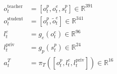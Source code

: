 \documentclass[border=7pt]{standalone}
\begin{document}
\color{ink}
$\displaystyle \begin{aligned}o_t^{\mathrm{teacher}}&=[o_t^p,o_t^e,s_t^p]\in\mathbb R^{391}\\o_t^{\mathrm{student}}&=[o_t^p,\widetilde o_t^e]\in\mathbb R^{341}\\l_t^e&=g_e(o_t^e)\in\mathbb R^{96}\\l_t^{\mathrm{priv}}&=g_p(s_t^p)\in\mathbb R^{24}\\a_t^T&=\pi_T([o_t^p,l_t^e,l_t^{\mathrm{priv}}])\in\mathbb R^{16}\end{aligned}$
\end{document}
